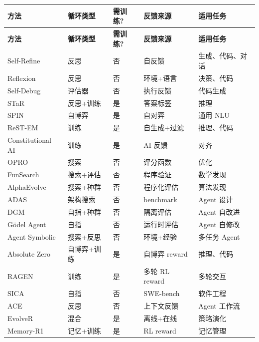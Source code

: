\begin{longtable}{p{2cm}p{2cm}p{1.5cm}p{2cm}p{3cm}}
\toprule
\textbf{方法} & \textbf{循环类型} & \textbf{需训练?} & \textbf{反馈来源} & \textbf{适用任务} \\
\midrule
\endfirsthead
\toprule
\textbf{方法} & \textbf{循环类型} & \textbf{需训练?} & \textbf{反馈来源} & \textbf{适用任务} \\
\midrule
\endhead
\bottomrule
\endlastfoot

Self-Refine & 反思 & 否 & 自反馈 & 生成、代码、对话 \\
Reflexion & 反思 & 否 & 环境+语言 & 决策、代码 \\
Self-Debug & 评估器 & 否 & 执行反馈 & 代码生成 \\
STaR & 反思+训练 & 是 & 答案标签 & 推理 \\
SPIN & 自博弈 & 是 & 自对弈 & 通用 NLU \\
ReST-EM & 训练 & 是 & 自生成+过滤 & 推理、代码 \\
Constitutional AI & 训练 & 是 & AI 反馈 & 对齐 \\
OPRO & 搜索 & 否 & 评分函数 & 优化 \\
FunSearch & 搜索+评估 & 否 & 程序验证 & 数学发现 \\
AlphaEvolve & 搜索+种群 & 否 & 程序化评估 & 算法发现 \\
ADAS & 架构搜索 & 否 & benchmark & Agent 设计 \\
DGM & 自指+种群 & 否 & 隔离评估 & Agent 自改进 \\
G\"{o}del Agent & 自指 & 否 & 运行时评估 & Agent 自修改 \\
Agent Symbolic & 搜索+反思 & 否 & 环境+经验 & 多任务 Agent \\
Absolute Zero & 自博弈+训练 & 是 & 自博弈 reward & 推理、代码 \\
RAGEN & 训练 & 是 & 多轮 RL reward & 多轮交互 \\
SICA & 自指 & 否 & SWE-bench & 软件工程 \\
ACE & 反思 & 否 & 上下文反馈 & Agent 工作流 \\
EvolveR & 混合 & 是 & 离线+在线 & 策略演化 \\
Memory-R1 & 记忆+训练 & 是 & RL reward & 记忆管理 \\
\end{longtable}
